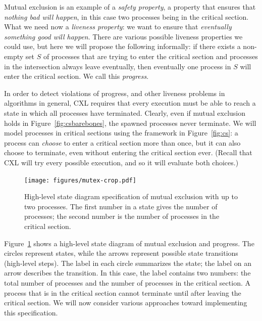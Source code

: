\documentclass{report}
\begin{document}
Mutual exclusion is an example of a \emph{safety property},
a property that ensures that \emph{nothing bad will happen}, in this case
two processes being in the critical section.
What we need now a \emph{liveness property}:
we want to ensure that
\emph{eventually something good will happen}.
There are various possible liveness properties we could use,
but here we will propose the following informally: if there exists a non-empty
set $S$ of processes that are trying to enter the critical section and
processes in the intersection always leave eventually, then eventually one
process in $S$ will enter the critical section.
We call this \emph{progress}.

In order to detect violations of progress, and other liveness problems in
algorithms in general, CXL requires that every execution must be
able to reach a state in which all processes have terminated.
Clearly, even if mutual exclusion holds in Figure~\ref{fig:csbarebones},
the spawned processes never terminate.  We
will model processes in critical sections using the framework in
Figure~\ref{fig:cs}: a process can \emph{choose} to enter a
critical section more than once, but it can also choose to terminate, even
without entering the critical section ever.
(Recall that CXL will try every possible execution, and so it will evaluate
both choices.)

\begin{figure}
\begin{center}
\texttt{[image: figures/mutex-crop.pdf]}
\end{center}
\caption{High-level state diagram specification of mutual exclusion with up to two processes.
The first number in a state gives the number of processes; the second number is the
number of processes in the critical section.}
\label{fig:mutex}
\end{figure}

Figure~\ref{fig:mutex} shows a high-level state diagram
 of mutual exclusion and progress.
The circles represent states, while the arrows represent possible state
transitions (high-level steps).  The label in each circle summarizes the state;
the label on an arrow describes the transition.  In this case,
the label contains two numbers: the total number of processes and the number
of processes in the critical section.  A process that is in the critical
section cannot terminate until after leaving the critical section.
We will now consider various approaches toward implementing this
specification.
\end{document}
